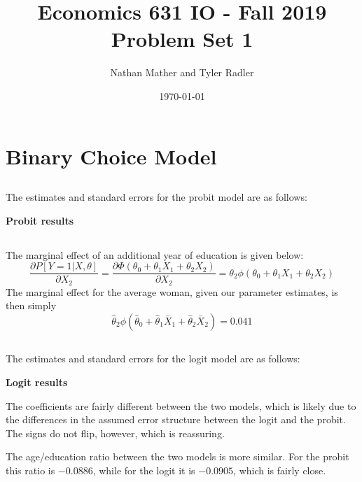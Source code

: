 \documentclass[11pt]{article}
\title{Economics 631 IO - Fall 2019\\Problem Set 1}
\author{Nathan Mather and Tyler Radler}
\date{\today}
\begin{document}
\maketitle

\section{Binary Choice Model}
\subsection{}
The estimates and standard errors for the probit model are as follows:

\begin{center}
	\centering
	\textbf{Probit results}\par\medskip
	\scalebox{1}{
		
	}
\end{center}

 
\subsection{}
The marginal effect of an additional year of education is given below:
$$\frac{\partial P[Y=1|X, \theta] }{\partial X_2} = \frac{\partial \Phi (\theta_0 + \theta_1X_1 + \theta_2X_2)}{\partial X_2} = \theta_2 \phi (\theta_0 + \theta_1X_1 + \theta_2X_2)$$
The marginal effect for the average woman, given our parameter estimates, is then simply
$$\widehat{\theta}_2 \phi (\widehat{\theta}_0 + \widehat{\theta}_1\bar{X}_1 + \widehat{\theta}_2\bar{X}_2) = 0.041$$

\subsection{}
The estimates and standard errors for the logit model are as follows:

\begin{center}
	\centering
	\textbf{Logit results}\par\medskip
	\scalebox{1}{
		
	}
\end{center}

The coefficients are fairly different between the two models, which is likely due to the differences in the assumed error structure between the logit and the probit. The signs do not flip, however, which is reassuring. 

The age/education ratio between the two models is more similar. For the probit this ratio is $-0.0886$, while for the logit it is $-0.0905$, which is fairly close.
\end{document}
